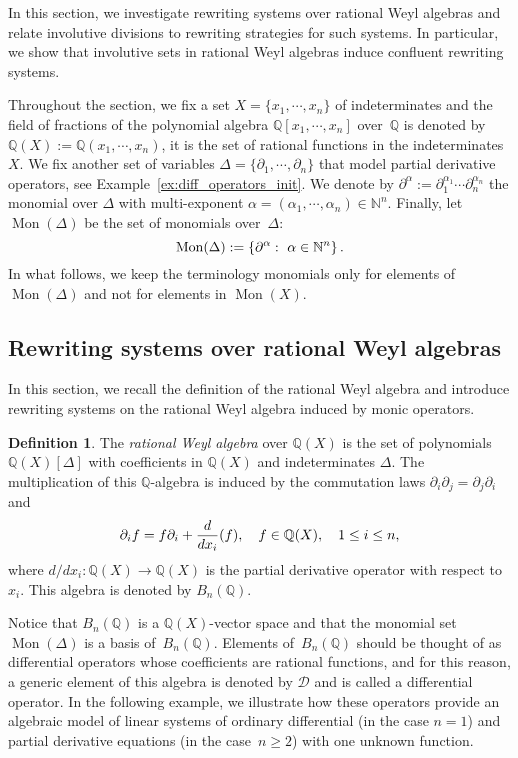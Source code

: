 \documentclass[11pt]{article}
\theoremstyle{definition}
\newtheorem{definition}[theorem]{Definition}
\newcommand\diff[1]{\partial_{#1}}
\newcommand\D{\mathcal{D}}
\newcommand\Q{\mathbb{Q}}
\newcommand\N{\mathbb{N}}
\newcommand\QX{\mathbb{Q}[x_1,\cdots,x_n]}
\newcommand\QXX{\mathbb{Q}(x_1,\cdots,x_n)}
\newcommand\Weyl[1]{B_{#1}(\Q)}
\newcommand\monBasis{\Mon(\Delta)}
\DeclareMathOperator{\Mon}{Mon}
\begin{document}
In this section, we investigate rewriting systems over rational Weyl
algebras and relate involutive divisions to rewriting strategies for such
systems. In particular, we show that involutive sets in rational Weyl
algebras induce confluent rewriting systems.
\medskip

Throughout the section, we fix a set $X=\{x_1,\cdots,x_n\}$ of
indeterminates and the field of fractions of the polynomial algebra $\QX$
over~$\Q$ is denoted by $\Q(X):=\QXX$, it is the set of rational
functions in the indeterminates $X$. We fix another set of
variables $\Delta=\{\diff{1},\cdots,\diff{n}\}$ that model partial
derivative operators, see Example~\ref{ex:diff_operators_init}. We denote
by $\partial^{\alpha}:=\diff{1}^{\alpha_1}\cdots\diff{n}^{\alpha_n}$ the
monomial over $\Delta$ with multi-exponent
$\alpha=(\alpha_1,\cdots,\alpha_n)\in\N^n$. Finally, let $\monBasis$ be
the set of monomials over~$\Delta$:
\[\monBasis:=\left\{\partial^\alpha:\ \alpha\in\N^n\right\}.
\smallskip\]
In what follows, we keep the terminology monomials only for elements of
$\Mon(\Delta)$ and not for elements in $\Mon(X)$.

\subsection{Rewriting systems over rational Weyl algebras}
\label{sec:rewriting_systems_over_Weyl_algebras}

In this section, we recall the definition of the rational Weyl algebra
and introduce rewriting systems on the rational Weyl algebra induced by
monic operators.
\medskip

\begin{definition}
  The {\it rational Weyl algebra} over $\Q(X)$ is the set of polynomials
  $\Q(X)[\Delta]$ with coefficients in $\Q(X)$ and indeterminates
  $\Delta$. The multiplication of this $\mathbb Q$-algebra is induced by
  the commutation laws $\partial_i\partial_j=\partial_j\partial_i$ and
  \[\diff{i}f=f\diff{i}+\frac{d}{dx_i}(f),\quad f\in\Q(X),\quad
  1\leq i\leq n,
  \smallskip\]
  where $d/dx_i:\Q(X)\to\Q(X)$ is the partial derivative operator with
  respect to~$x_i$. This algebra is denoted by $\Weyl{n}$.
\end{definition}
\smallskip

Notice that $\Weyl{n}$ is a $\Q(X)$-vector space and that the monomial 
set $\monBasis$ is a basis of~$\Weyl{n}$. Elements of~$\Weyl{n}$ should 
be thought of as differential operators whose coefficients are rational
functions, and for this reason, a generic element of this algebra is
denoted by $\D$ and is called a differential operator. In the following
example, we illustrate how these operators provide an algebraic model of
linear systems of ordinary differential (in the case $n=1$) and partial
derivative equations (in the case~$n\geq 2$) with one unknown function. 
\smallskip
\end{document}
